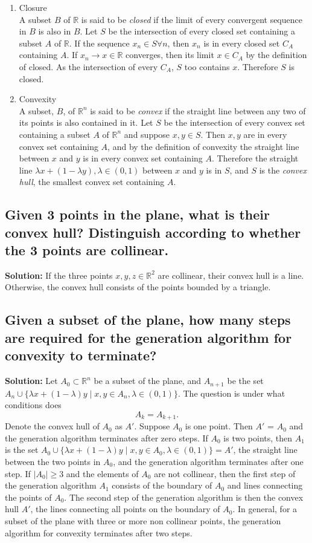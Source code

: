 \documentclass{article}
\newcommand{\exercise}[1]{\subsection{\normalfont #1}}
\newcommand{\solution}{\indent\indent \textbf{Solution: }}
\begin{document}
\begin{enumerate}
\item Closure \\
A subset $B$ of $\mathbb{R}$ is said to be \textit{closed} if the limit of every convergent sequence in $B$ is also in $B$. Let $S$ be the intersection of every closed set containing a subset $A$ of $\mathbb{R}$. If the sequence $x_n \in S \forall n$, then $x_n$ is in every closed set $C_A$ containing $A$. If $x_n \to x \in \mathbb{R}$ converges, then its limit $x \in C_A$ by the definition of closed. As the intersection of every $C_A$, $S$ too contains $x$. Therefore $S$ is closed. 

\item Convexity \\
A subset, $B$, of $\mathbb{R}^n$ is said to be \textit{convex} if the straight line between any two of its points is also contained in it. Let $S$ be the intersection of every convex set containing a subset $A$ of $\mathbb{R}^n$ and suppose $x, y \in S$. Then $x, y$ are in every convex set containing $A$, and by the definition of convexity the straight line between $x$ and $y$ is in every convex set containing $A$. Therefore the straight line $\lambda x + (1- \lambda y), \lambda \in (0, 1)$ between $x$ and $y$ is in $S$, and $S$ is the \textit{convex hull}, the smallest convex set containing $A$.  

\end{enumerate}

\exercise{Given 3 points in the plane, what is their convex hull? Distinguish according to whether the 3 points are collinear.}
\solution 
If the three points $x, y, z\in \mathbb{R}^2$ are collinear, their convex hull is a line. Otherwise, the convex hull consists of the points bounded by a triangle. 

\exercise{Given a subset of the plane, how many steps are required for the generation algorithm for convexity to terminate?}
\solution
Let $A_0\subset \mathbb{R}^n$ be a subset of the plane, and $A_{n+1}$ be the set $A_n \cup \{\lambda x + (1-\lambda)y \mid x, y \in A_{n}, \lambda \in (0,1)\}$. The question is under what conditions does $$A_k = A_{k+1}.$$ Denote the convex hull of $A_0$ as $A'$. Suppose $A_0$ is one point. Then $A'$ = $A_0$ and the generation algorithm terminates after zero steps. If $A_0$ is two points, then $A_1$ is the set $A_0 \cup \{\lambda x + (1-\lambda)y \mid x, y \in A_0, \lambda \in (0,1)\} =A'$, the straight line between the two points in $A_0$, and the generation algorithm terminates after one step. If $|A_0| \geq 3$ and the elements of $A_0$ are not collinear, then the first step of the generation algorithm $A_1$ consists of the boundary of $A_0$ and lines connecting the points of $A_0$. The second step of the generation algorithm is then the convex hull $A'$, the lines connecting all points on the boundary of $A_0$. In general, for a subset of the plane with three or more non collinear points, the generation algorithm for convexity terminates after two steps. 
\end{document}

